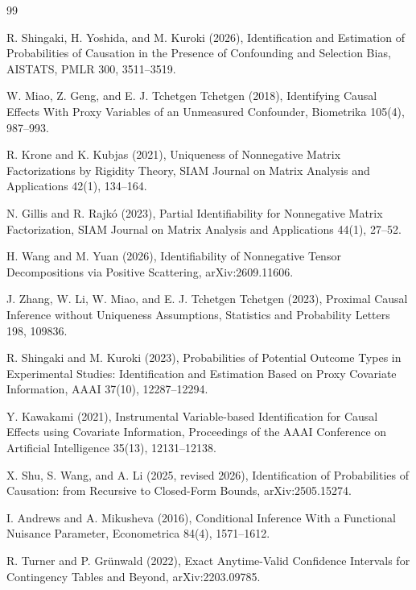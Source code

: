 \documentclass{article}
\begin{document}
\begin{thebibliography}{99}

   R. Shingaki, H. Yoshida, and M. Kuroki (2026), Identification and Estimation of Probabilities of Causation in the Presence of Confounding and Selection Bias, AISTATS, PMLR 300, 3511--3519.

   W. Miao, Z. Geng, and E. J. Tchetgen Tchetgen (2018), Identifying Causal Effects With Proxy Variables of an Unmeasured Confounder, Biometrika 105(4), 987--993.

   R. Krone and K. Kubjas (2021), Uniqueness of Nonnegative Matrix Factorizations by Rigidity Theory, SIAM Journal on Matrix Analysis and Applications 42(1), 134--164.

   N. Gillis and R. Rajk\'o (2023), Partial Identifiability for Nonnegative Matrix Factorization, SIAM Journal on Matrix Analysis and Applications 44(1), 27--52.

   H. Wang and M. Yuan (2026), Identifiability of Nonnegative Tensor Decompositions via Positive Scattering, arXiv:2609.11606.

   J. Zhang, W. Li, W. Miao, and E. J. Tchetgen Tchetgen (2023), Proximal Causal Inference without Uniqueness Assumptions, Statistics and Probability Letters 198, 109836.

   R. Shingaki and M. Kuroki (2023), Probabilities of Potential Outcome Types in Experimental Studies: Identification and Estimation Based on Proxy Covariate Information, AAAI 37(10), 12287--12294.

   Y. Kawakami (2021), Instrumental Variable-based Identification for Causal Effects using Covariate Information, Proceedings of the AAAI Conference on Artificial Intelligence 35(13), 12131--12138.

   X. Shu, S. Wang, and A. Li (2025, revised 2026), Identification of Probabilities of Causation: from Recursive to Closed-Form Bounds, arXiv:2505.15274.

   I. Andrews and A. Mikusheva (2016), Conditional Inference With a Functional Nuisance Parameter, Econometrica 84(4), 1571--1612.

   R. Turner and P. Grünwald (2022), Exact Anytime-Valid Confidence Intervals for Contingency Tables and Beyond, arXiv:2203.09785.


\end{thebibliography}
\end{document}
